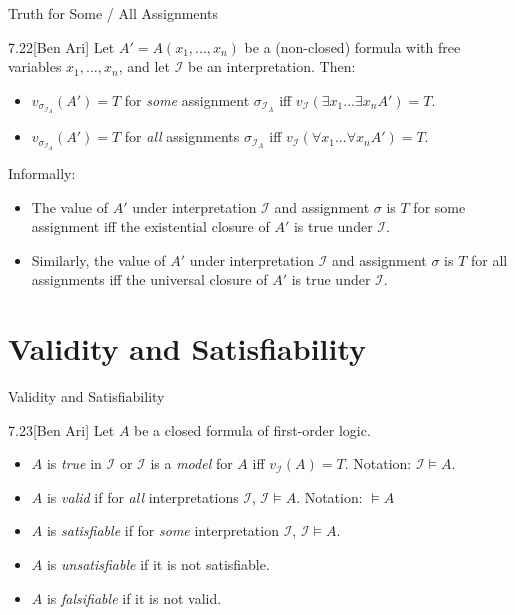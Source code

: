 \documentclass[style=sailor,size=12pt]{powerdot}
\begin{document}
\begin{wideslide}[bm=,toc=]{Truth for Some / All Assignments}
\begin{thm}{7.22}[Ben Ari]
Let $A' = A(x_1,...,x_n)$ be a (non-closed) formula with free variables
$x_1,...,x_n$, and let $\mathcal{I}$ be an interpretation. Then:
\end{thm}
\vspace*{-2ex}
\begin{itemize}
\item $v_{\sigma_{\mathcal{I}_A}}(A') = T$ for \emph{some} assignment $\sigma_{\mathcal{I}_A}$ iff $v_{\mathcal{I}}(\exists x_1 ... \exists x_n A') = T$.
\item $v_{\sigma_{\mathcal{I}_A}}(A') = T$ for \emph{all} assignments
$\sigma_{\mathcal{I}_A}$ iff $v_{\mathcal{I}}(\forall x_1 ... \forall x_n A') = T$.
\end{itemize}
Informally:
\begin{itemize}
\item The value of $A'$ under interpretation $\mathcal{I}$ and assignment
$\sigma$ is $T$ for some assignment iff the existential closure of $A'$ is true 
under $\mathcal{I}$. 
\item Similarly, the value of $A'$ under interpretation $\mathcal{I}$ and assignment
$\sigma$ is $T$ for all assignments iff the universal closure of $A'$ is true 
under $\mathcal{I}$. 
\end{itemize}
\end{wideslide}

\section[slide=false]{Validity and Satisfiability}

\begin{wideslide}[bm=,toc=]{Validity and Satisfiability}
\begin{defn}{7.23}[Ben Ari]
Let $A$ be a closed formula of first-order logic.
\end{defn}
\vspace{-2ex}
\begin{itemize}
\item $A$ is \emph{true} in $\mathcal{I}$ or $\mathcal{I}$ is a \emph{model} for
$A$ iff $v_{\mathcal{I}}(A) = T$. Notation: $\mathcal{I} \models A$.
\item $A$ is \emph{valid} if for \emph{all} interpretations $\mathcal{I}$,
$\mathcal{I} \models A$. Notation: $\models A$ 
\item $A$ is \emph{satisfiable} if for \emph{some} interpretation $\mathcal{I}$,
$\mathcal{I} \models A$.
\item $A$ is \emph{unsatisfiable} if it is not satisfiable. 
\item $A$ is \emph{falsifiable} if it is not valid. 
\end{itemize}

\end{wideslide}
\end{document}
